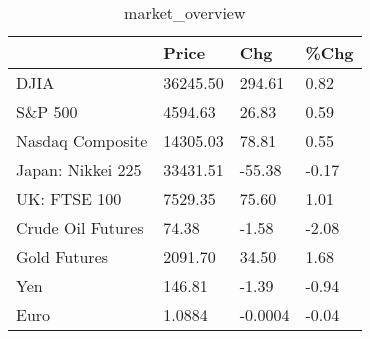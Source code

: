 \documentclass{article}%
\begin{document}
%


\begin{table}[htbp]%
\caption{market\_overview}%
\centering%
\begin{adjustbox}{width=1\textwidth}%
\begin{tabular}{llll}
\toprule
                  &    Price &     Chg &  \%Chg \\
\midrule
             DJIA & 36245.50 &  294.61 &  0.82 \\
          S\&P 500 &  4594.63 &   26.83 &  0.59 \\
 Nasdaq Composite & 14305.03 &   78.81 &  0.55 \\
Japan: Nikkei 225 & 33431.51 &  -55.38 & -0.17 \\
     UK: FTSE 100 &  7529.35 &   75.60 &  1.01 \\
Crude Oil Futures &    74.38 &   -1.58 & -2.08 \\
     Gold Futures &  2091.70 &   34.50 &  1.68 \\
              Yen &   146.81 &   -1.39 & -0.94 \\
             Euro &   1.0884 & -0.0004 & -0.04 \\
\bottomrule
\end{tabular}
%
\end{adjustbox}%
\end{table}

%
\end{document}

